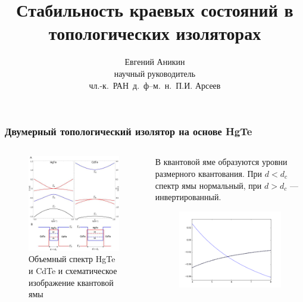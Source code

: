 \documentclass{beamer}
\title{Стабильность краевых состояний в топологических изоляторах}
\author[Е. Аникин]{Евгений Аникин \\
	научный руководитель\\
	чл.-к.~РАН~д.~ф--м.~н.~П.И. Арсеев}
\institute{ФИАН им. Лебедева}
\date{}
\begin{document}
\begin{frame}
    \titlepage
\end{frame}

\begin{frame}
    \frametitle{Двумерный топологический изолятор на основе HgTe}
    \begin{columns}[T]
        \begin{column}{0.5\textwidth}
            \begin{figure}[h]
                \includegraphics[width=0.95\linewidth]{quantum_well.png}
                \caption{Объемный спектр HgTe и CdTe и 
                         схематическое изображение квантовой ямы}
            \end{figure}
        \end{column}
        \begin{column}{0.5\textwidth}
            В квантовой яме образуются уровни размерного квантования. При
            $d < d_c$ спектр ямы нормальный, при $d > d_c$ --- 
            инвертированный.
            \begin{figure}
                \includegraphics[width=0.95\linewidth]{levels.png}

\end{figure}
\end{column}
\end{columns}
\end{frame}
\end{document}
